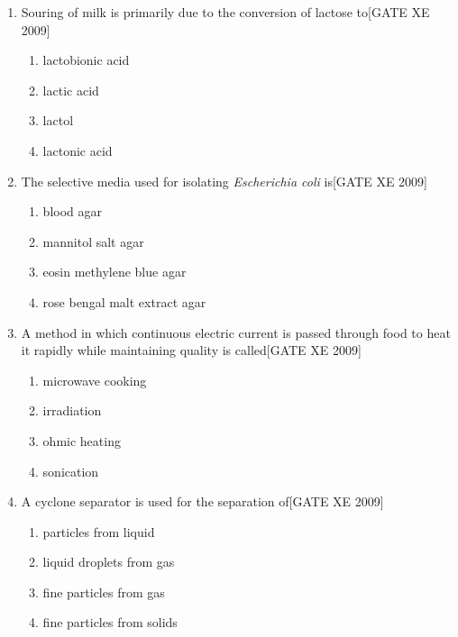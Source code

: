 \documentclass[journal,12pt,onecolumn]{IEEEtran}
\theoremstyle{remark}
\begin{document}
\begin{enumerate}
\item Souring of milk is primarily due to the conversion of lactose to\hfill[GATE XE 2009]
\begin{multicols}{2}
\begin{enumerate}
\item lactobionic acid
\item lactic acid
\item lactol
\item lactonic acid
\end{enumerate}
\end{multicols}

\item The selective media used for isolating \textit{Escherichia coli} is\hfill[GATE XE 2009]
\begin{multicols}{2}
\begin{enumerate}
\item blood agar
\item mannitol salt agar
\item eosin methylene blue agar
\item rose bengal malt extract agar
\end{enumerate}
\end{multicols}

\item A method in which continuous electric current is passed through food to heat it rapidly while maintaining quality is called\hfill[GATE XE 2009]
\begin{multicols}{2}
\begin{enumerate}
\item microwave cooking
\item irradiation
\item ohmic heating
\item sonication
\end{enumerate}
\end{multicols}

\item A cyclone separator is used for the separation of\hfill[GATE XE 2009]
\begin{multicols}{2}
\begin{enumerate}
\item particles from liquid
\item liquid droplets from gas
\item fine particles from gas
\item fine particles from solids
\end{enumerate}
\end{multicols}




\end{enumerate}
\end{document}
